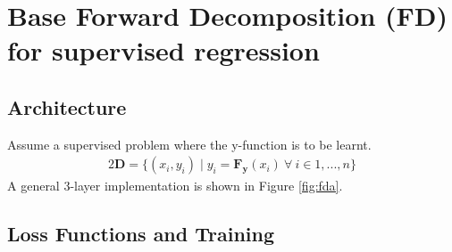 \documentclass[12pt]{iopart}
\theoremstyle{break}
\begin{document}
\section{Base Forward Decomposition (FD) for supervised regression}
\subsection{Architecture}
Assume a supervised problem where the y-function is to be learnt.
\begin{alignat}{2}
\mathbf{D} = \{(x_i,y_i) \mid y_i = \mathbf{F_y}(x_i)\:\forall\:i \in 1,...,n \}
\end{alignat}
A general 3-layer implementation is shown in Figure \ref{fig:fda}.

\begin{figure}[htpb]
\centering


\end{figure}

\subsection{Loss Functions and Training}
\end{document}

